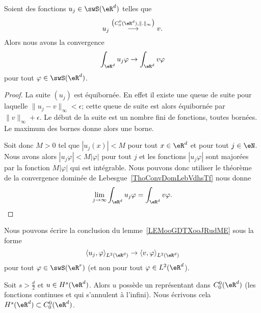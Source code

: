 \begin{lemma}       \label{LEMooGDTXooJRudME}
	Soient des fonctions \(u_j\in\swS(\eR^d) \) telles que
	\begin{equation}
		u_j\stackrel{\big( C_0^0(\eR^d),\| . \|_{\infty} \big)}{\longrightarrow}v.
	\end{equation}
	Alors nous avons la convergence
	\begin{equation}
		\int_{\eR^d}u_j\varphi\to\int_{\eR^d}v\varphi
	\end{equation}
	pour tout \( \varphi\in\swS(\eR^d)\).
\end{lemma}

\begin{proof}
	La suite \( (u_j)\) est équibornée. En effet il existe une queue de suite pour laquelle \( \| u_j-v \|_{\infty}<\epsilon\); cette queue de suite est alors équibornée par \( \| v \|_{\infty}+\epsilon\). Le début de la suite est un nombre fini de fonctions, toutes bornées. Le maximum des bornes donne alors une borne.

	Soit donc \( M>0\) tel que \( | u_j(x) |<M\) pour tout \( x\in \eR^d\) et pour tout \( j\in \eN\). Nous avons alors \( | u_j\varphi |<M| \varphi |\) pour tout \( j\) et les fonctions \(  | u_j\varphi | \) sont majorées par la fonction \( M| \varphi |\) qui est intégrable. Nous pouvons donc utiliser le théorème de la convergence dominée de Lebesgue~\ref{ThoConvDomLebVdhsTf} nous donne
	\begin{equation}
		\lim_{j\to \infty} \int_{\eR^d} u_j\varphi=\int_{\eR^d}v\varphi.
	\end{equation}
\end{proof}

Nous pouvons écrire la conclusion du lemme~\ref{LEMooGDTXooJRudME} sous la forme
\begin{equation}
	\langle u_j, \varphi\rangle_{L^2(\eR^d)}\to \langle v, \varphi\rangle_{L^2(\eR^d)}
\end{equation}
pour tout \( \varphi\in \swS(\eR^r)\) (et non pour tout \( \varphi\in L^2(\eR^d\)).

\begin{theorem}[Théorème de Sobolev avec \( k=0\)\cite{ooFZERooPVhoge}]     \label{THOooOHIPooXSEkVI}
	Soit \( s>\frac{ d }{ 2 }\) et \( u\in H^s(\eR^d)\). Alors \( u\) possède un représentant dans \( C^0_0(\eR^d)\) (les fonctions continues et qui s'annulent à l'infini). Nous écrivons cela \( H^s(\eR^d)\subset C_0^0(\eR^d)\).
\end{theorem}

